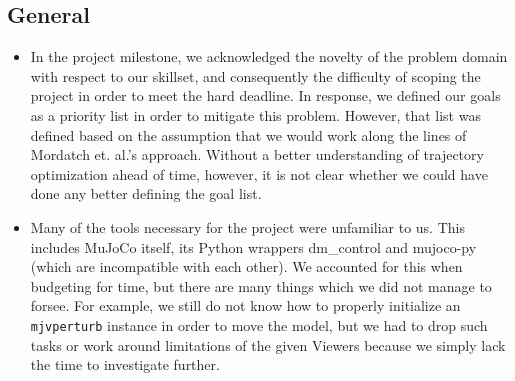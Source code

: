 \documentclass{article}
\begin{document}
\subsection{General}
\begin{itemize}
	
	\item In the project milestone, we acknowledged the novelty of the problem domain with respect to our skillset, and consequently the difficulty of scoping the project in order to meet the hard deadline. In response, we defined our goals as a priority list in order to mitigate this problem. However, that list was defined based on the assumption that we would work along the lines of Mordatch et. al.'s approach. Without a better understanding of trajectory optimization ahead of time, however, it is not clear whether we could have done any better defining the goal list.
	
	\item Many of the tools necessary for the project were unfamiliar to us. This includes MuJoCo itself, its Python wrappers dm\_control and mujoco-py (which are incompatible with each other). We accounted for this when budgeting for time, but there are many things which we did not manage to forsee. For example, we still do not know how to properly initialize an \texttt{mjvperturb} instance in order to move the model, but we had to drop such tasks or work around limitations of the given Viewers because we simply lack the time to investigate further.
	
\end{itemize}
\end{document}
